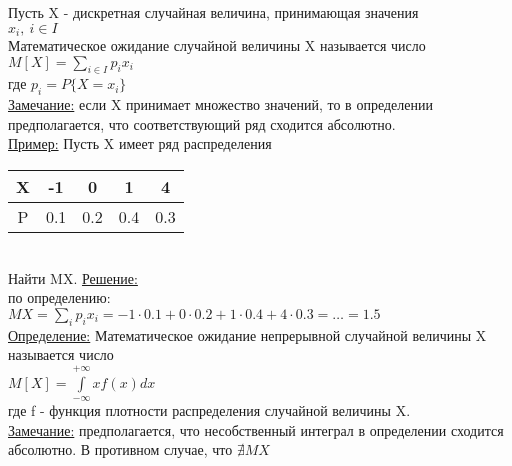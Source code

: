 

Пусть X - дискретная случайная величина, принимающая значения\\
$x_i, \ i \in I$\\
Математическое ожидание случайной величины X называется число\\
$M[X] = \sum\limits_{i \in I} p_i x_i$\\
где $p_i = P\{X = x_i\}$\\


\underline{Замечание:} если X принимает множество значений, то в определении предполагается, что соответствующий ряд сходится абсолютно.\\


\underline{Пример:} Пусть X имеет ряд распределения\\

\begin{tabular}{|c||c|c|c|c|}
\hline 
X & -1 & 0 & 1 & 4 \\ 
\hline 
P & 0.1 & 0.2 & 0.4 & 0.3 \\ 
\hline 
\end{tabular} \\

Найти MX.
\underline{Решение:}\\
по определению:\\
$MX = \sum\limits_i p_i x_i = -1 \cdot 0.1 + 0 \cdot 0.2 + 1 \cdot 0.4 + 4 \cdot 0.3 = \ldots = 1.5$\\


\underline{Определение:} Математическое ожидание непрерывной случайной величины X называется число\\
$\displaystyle  M[X] = \int\limits_{-\infty}^{+\infty} x f(x) dx$\\
где f - функция плотности распределения случайной величины X.\\


\underline{Замечание:} предполагается, что несобственный интеграл в определении сходится абсолютно. В противном случае, что $\nexists MX$\\


